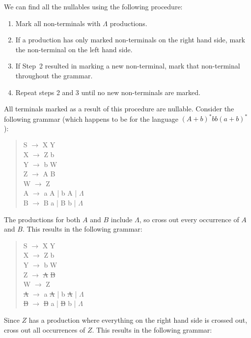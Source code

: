 \documentclass[letterpaper,12pt,openany,reqno]{book}%
\begin{document}
We can find all the nullables using the following procedure:
\begin{enumerate}
\item Mark all non-terminals with $\Lambda$ productions.
\item If a production has only marked non-terminals on the right hand side, mark the non-terminal on the left hand side.
\item If Step~2 resulted in marking a new non-terminal, mark that non-terminal throughout the grammar.
\item Repeat steps 2 and 3 until no new non-terminals are marked.
\end{enumerate}
All terminals marked as a result of this procedure are nullable. Consider the following grammar (which happens to be for the language $(A+b)^*bb(a+b)^*$):
\begin{quote}
{\ttfamily S} $\rightarrow$ {\ttfamily X Y}\\
{\ttfamily X} $\rightarrow$ {\ttfamily Z b}\\
{\ttfamily Y} $\rightarrow$ {\ttfamily b W}\\
{\ttfamily Z} $\rightarrow$ {\ttfamily A B}\\
{\ttfamily W} $\rightarrow$ {\ttfamily Z}\\
{\ttfamily A} $\rightarrow$ {\ttfamily a A | b A | $\Lambda$}\\
{\ttfamily B} $\rightarrow$ {\ttfamily B a | B b | $\Lambda$}\\
\end{quote}
The productions for both $A$ and $B$ include $\Lambda$, so cross out every occurrence of $A$ and $B$. This results in the following grammar:
\begin{quote}
{\ttfamily S} $\rightarrow$ {\ttfamily X Y}\\
{\ttfamily X} $\rightarrow$ {\ttfamily Z b}\\
{\ttfamily Y} $\rightarrow$ {\ttfamily b W}\\
{\ttfamily Z} $\rightarrow$ {\ttfamily \sout{A} \sout{B}}\\
{\ttfamily W} $\rightarrow$ {\ttfamily Z}\\
{\ttfamily \sout{A}} $\rightarrow$ {\ttfamily a \sout{A} | b \sout{A} | $\Lambda$}\\
{\ttfamily \sout{B}} $\rightarrow$ {\ttfamily \sout{B} a | \sout{B} b | $\Lambda$}\\
\end{quote}
Since $Z$ has a production where everything on the right hand side is crossed out, cross out all occurrences of $Z$. This results in the following grammar:
\end{document}
